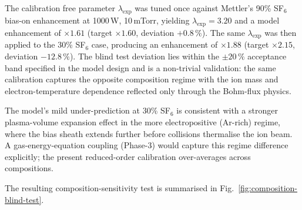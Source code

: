 The calibration free parameter $\lambda_\mathrm{exp}$ was tuned once
against Mettler's 90\% SF$_6$ bias-on enhancement at 1000\,W, 10\,mTorr,
yielding $\lambda_\mathrm{exp} = 3.20$ and a model enhancement of
$\times 1.61$ (target $\times 1.60$, deviation $+0.8\,\%$).  The same
$\lambda_\mathrm{exp}$ was then applied to the 30\% SF$_6$ case,
producing an enhancement of $\times 1.88$ (target $\times 2.15$,
deviation $-12.8\,\%$).  The blind test deviation lies within the
$\pm 20\,\%$ acceptance band specified in the model design and is a
non-trivial validation: the same calibration captures the opposite
composition regime with the ion mass and electron-temperature
dependence reflected only through the Bohm-flux physics.

The model's mild under-prediction at 30\% SF$_6$ is consistent with a
stronger plasma-volume expansion effect in the more electropositive
(Ar-rich) regime, where the bias sheath extends further before
collisions thermalise the ion beam.  A gas-energy-equation coupling
(Phase-3) would capture this regime difference explicitly; the present
reduced-order calibration over-averages across compositions.

The resulting composition-sensitivity test is summarised in
Fig.~\ref{fig:composition-blind-test}.
